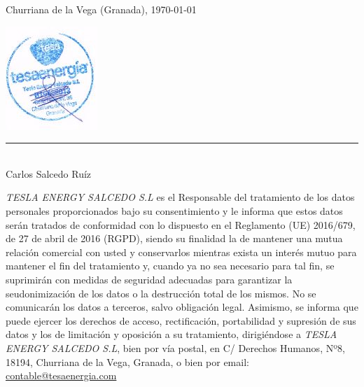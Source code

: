\documentclass[fontsize=11pt, Myfinal=true, oneside, numbers=noenddot]{report}
\newcommand{\firmado}[2]{%
\vspace{0.5cm}
  \parbox{\textwidth}{
    \centering #2 \today\\
   
   \begin{center} 
\includegraphics[scale=1,angle=90]{figuras/03-SELLO TESA}
\end{center}    
    \parbox{9cm}{
      \centering
      \rule{6cm}{1pt}\\
       #1 
    }
    \hfill
  }
}
\begin{document}
\firmado{Carlos Salcedo Ruíz}{Churriana de la Vega (Granada),}

\vspace{1cm}
\small
\textit{TESLA ENERGY SALCEDO S.L} es el Responsable del tratamiento de los datos personales proporcionados bajo su consentimiento y le informa que estos datos serán tratados de conformidad con lo dispuesto en el Reglamento (UE) 2016/679, de 27 de abril de 2016 (RGPD), siendo su finalidad la de mantener una mutua relación comercial con usted y conservarlos mientras exista un interés mutuo para mantener el fin del tratamiento y, cuando ya no sea necesario para tal fin, se suprimirán con medidas de seguridad adecuadas para garantizar la seudonimización de los datos o la destrucción total de los mismos. No se comunicarán los datos a terceros, salvo obligación legal. Asimismo, se informa que puede ejercer los derechos de acceso, rectificación, portabilidad y supresión de sus datos y los de limitación y oposición a su tratamiento, dirigiéndose a \textit{TESLA ENERGY SALCEDO S.L}, bien por vía postal, en C/ Derechos Humanos, Nº8, 18194, Churriana de la Vega, Granada, o bien por email: \underline{contable@tesaenergia.com}

%
\end{document}
